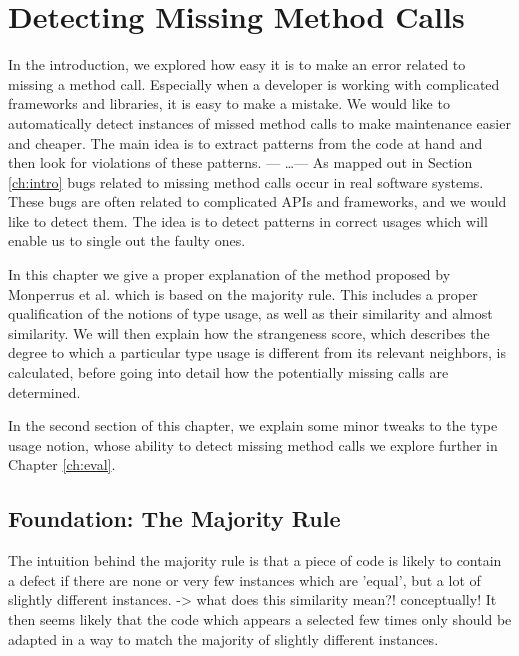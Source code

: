 \chapter{Detecting Missing Method Calls}\label{ch:dmmc}


In the introduction, we explored how easy it is to make an error related to missing a method call.
Especially when a developer is working with complicated frameworks and libraries, it is easy to make a mistake.
We would like to automatically detect instances of missed method calls to make maintenance easier and cheaper.
The main idea is to extract patterns from the code at hand and then look for violations of these patterns.
--- \ldots ---
As mapped out in Section \ref{ch:intro} bugs related to missing method calls occur in real software systems.
These bugs are often related to complicated APIs and frameworks, and we would like to detect them.
The idea is to detect patterns in correct usages which will enable us to single out the faulty ones.

In this chapter we give a proper explanation of the method proposed by Monperrus et al. \cite{monperrus2010detecting}\cite{monperrus2013detecting} which is based on the majority rule.
This includes a proper qualification of the notions of type usage, as well as their similarity and almost similarity.
We will then explain how the strangeness score, which describes the degree to which a particular type usage is different from its relevant neighbors, is calculated, before going into detail how the potentially missing calls are determined.

In the second section of this chapter, we explain some minor tweaks to the type usage notion, whose ability to detect missing method calls we explore further in Chapter \ref{ch:eval}.

\section{Foundation: The Majority Rule}\label{sec:majority}

The intuition behind the majority rule is that a piece of code is likely to contain a defect if there are none or very few instances which are 'equal', but a lot of slightly different instances.
-> what does this similarity mean?! conceptually!
It then seems likely that the code which appears a selected few times only should be adapted in a way to match the majority of slightly different instances.

